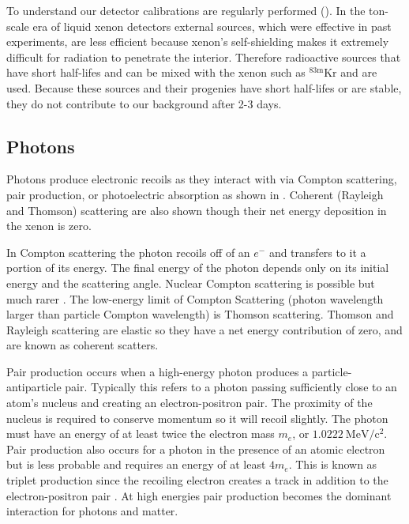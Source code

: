 To understand our detector calibrations are regularly performed ().  In the ton-scale era of liquid xenon
detectors external sources, which were effective in past experiments, are less efficient because xenon's self-shielding makes it extremely
difficult for radiation to penetrate the interior.  Therefore radioactive
sources that have short half-lifes and can be mixed with the xenon such as $\mathrm{^{83m}Kr}$ and \radoncal are used.  Because these
sources and their progenies have short half-lifes or are stable, they do not contribute to our background after 2-3 days.

\subsection{Photons}
\label{subsec:photons}
Photons produce electronic recoils as they interact with \electron via Compton scattering, pair production, or photoelectric absorption
as shown in .  Coherent (Rayleigh and Thomson) scattering are also shown though their net energy deposition in the
xenon is zero.

In Compton scattering the photon recoils off of an $e^{-}$ and transfers to it a portion of its energy.  The final energy of the photon
depends only on its initial energy and the scattering angle.  Nuclear Compton scattering is possible but much rarer
.  The low-energy limit of Compton Scattering (photon wavelength larger than particle Compton wavelength) is
Thomson scattering.  Thomson and Rayleigh scattering are elastic so they have a net energy contribution of zero, and are known as coherent
scatters.

Pair production occurs when a high-energy photon produces a particle-antiparticle pair.  Typically this refers to a photon passing
sufficiently
close to an atom's nucleus and creating an electron-positron pair.  The proximity of the nucleus is required to conserve momentum so it
will recoil slightly.  The photon must have an energy of at least twice the electron mass $m_{e}$, or $1.0222\ \mathrm{MeV/c^2}$.  Pair
production
also occurs for a photon in the presence of an atomic electron but is less probable and requires an energy of at least $4m_{e}$.  This
is known as triplet production since the recoiling electron creates a track in addition to the electron-positron pair
.  At high energies pair production becomes the dominant interaction for photons and matter.

